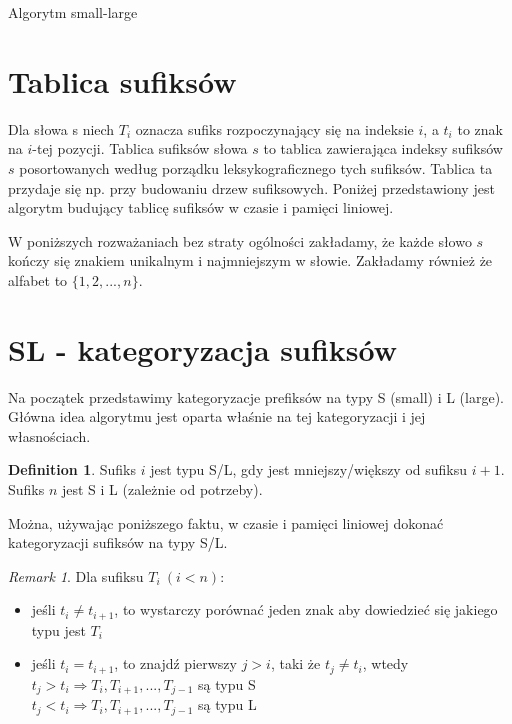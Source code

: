 \documentclass[
12pt
]{article}
\theoremstyle{definition}
\newtheorem{definition}{Definition}
\theoremstyle{remark}
\newtheorem*{remark}{Remark}
\begin{document}
\begin{center}
\Huge Algorytm small-large
\end{center}


\section*{Tablica sufiksów}
Dla słowa s niech $T_i$ oznacza sufiks rozpoczynający się na indeksie $i$, a $t_i$ to znak na $i$-tej pozycji. Tablica sufiksów słowa $s$ to tablica zawierająca indeksy sufiksów $s$ posortowanych według porządku leksykograficznego tych sufiksów. Tablica ta przydaje się np. przy budowaniu drzew sufiksowych. Poniżej przedstawiony jest algorytm budujący tablicę sufiksów w czasie i pamięci liniowej.

W poniższych rozważaniach bez straty ogólności zakładamy, że każde słowo $s$ kończy się znakiem unikalnym i najmniejszym w słowie. Zakładamy również że alfabet to $\{1,2,...,n\}$.

\section*{SL - kategoryzacja sufiksów}

Na początek przedstawimy kategoryzacje prefiksów na typy S (small) i L (large). Główna idea algorytmu jest oparta właśnie na tej kategoryzacji i jej własnościach.

\begin{definition}
Sufiks $i$ jest typu S/L, gdy jest mniejszy/większy od sufiksu $i+1$. Sufiks $n$ jest S i L (zależnie od potrzeby).
\end{definition}

Można, używając poniższego faktu, w czasie i pamięci liniowej dokonać kategoryzacji sufiksów na typy S/L.

\begin{remark}
Dla sufiksu $T_i \ (i<n)$:

\begin{itemize}
\item jeśli $t_i \neq t_{i+1}$, to wystarczy porównać jeden znak aby dowiedzieć się jakiego typu jest $T_i$
\item
jeśli $t_{i} = t_{i+1}$, to znajdź pierwszy $j > i$, taki że $t_j \neq t_i$, wtedy \\
$ t_j > t_i \Rightarrow T_i,T_{i+1},...,T_{j-1}$ są typu S \\
$ t_j < t_i \Rightarrow T_i,T_{i+1},...,T_{j-1}$ są typu L
\end{itemize}

\end{remark}
\end{document}
